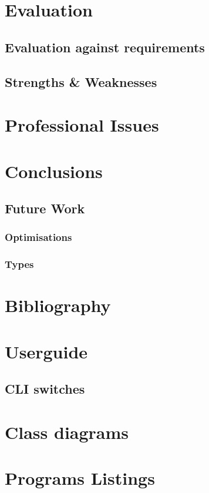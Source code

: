 \documentclass[11pt]{report}
\begin{document}

\chapter{Evaluation}
\section{Evaluation against requirements}
\section{Strengths \& Weaknesses}

\chapter{Professional Issues}

\chapter{Conclusions}
\section{Future Work}
\subsection{Optimisations}
\subsection{Types}

\chapter{Bibliography}

\begin{appendices}

\chapter{Userguide}
\section{CLI switches}

\chapter{Class diagrams}

\chapter{Programs Listings}

\end{appendices}
\end{document}
